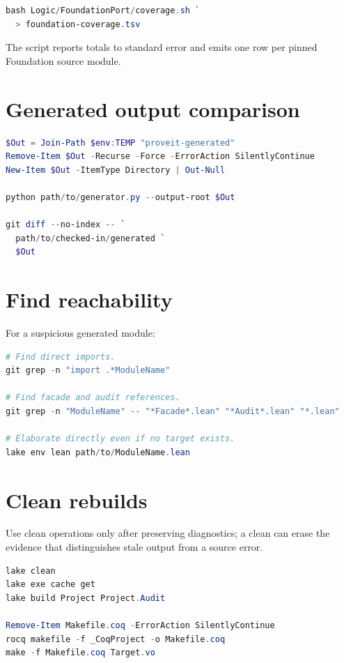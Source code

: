 \documentclass[
  10pt,
  a4paper,
  twoside,
  open=any,
  parskip=half,
  headings=big
]{scrreprt}
\begin{document}
\begin{lstlisting}[language=PowerShell]
bash Logic/FoundationPort/coverage.sh `
  > foundation-coverage.tsv
\end{lstlisting}

The script reports totals to standard error and emits one row per pinned
Foundation source module.

\section{Generated output comparison}

\begin{lstlisting}[language=PowerShell]
$Out = Join-Path $env:TEMP "proveit-generated"
Remove-Item $Out -Recurse -Force -ErrorAction SilentlyContinue
New-Item $Out -ItemType Directory | Out-Null

python path/to/generator.py --output-root $Out

git diff --no-index -- `
  path/to/checked-in/generated `
  $Out
\end{lstlisting}

\section{Find reachability}

For a suspicious generated module:

\begin{lstlisting}[language=PowerShell]
# Find direct imports.
git grep -n "import .*ModuleName"

# Find facade and audit references.
git grep -n "ModuleName" -- "*Facade*.lean" "*Audit*.lean" "*.lean"

# Elaborate directly even if no target exists.
lake env lean path/to/ModuleName.lean
\end{lstlisting}

\section{Clean rebuilds}

Use clean operations only after preserving diagnostics; a clean can erase the
evidence that distinguishes stale output from a source error.

\begin{lstlisting}[language=PowerShell]
lake clean
lake exe cache get
lake build Project Project.Audit

Remove-Item Makefile.coq -ErrorAction SilentlyContinue
rocq makefile -f _CoqProject -o Makefile.coq
make -f Makefile.coq Target.vo
\end{lstlisting}
\end{document}
